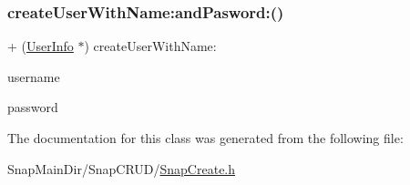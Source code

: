 \hypertarget{interface_snap_create_a43294c2a2a9227453be82d6988f8ae79}{}\label{interface_snap_create_a43294c2a2a9227453be82d6988f8ae79} 
\subsubsection{\texorpdfstring{create\+User\+With\+Name\+:and\+Pasword\+:()}{createUserWithName:andPasword:()}}
{\footnotesize\ttfamily + (\hyperlink{interface_user_info}{User\+Info} $\ast$) create\+User\+With\+Name\+: \begin{DoxyParamCaption}\item[{(N\+S\+String $\ast$)}]{username }\item[{andPasword:(N\+S\+String $\ast$)}]{password }\end{DoxyParamCaption}}



The documentation for this class was generated from the following file\+:\begin{DoxyCompactItemize}
\item 
Snap\+Main\+Dir/\+Snap\+C\+R\+U\+D/\hyperlink{_snap_create_8h}{Snap\+Create.\+h}\end{DoxyCompactItemize}
